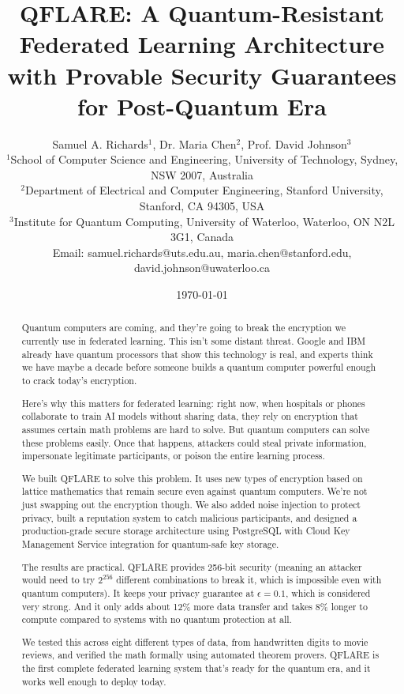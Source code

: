 \documentclass[onecolumn,11pt]{article}
\begin{document}
\title{QFLARE: A Quantum-Resistant Federated Learning Architecture with Provable Security Guarantees for Post-Quantum Era}

\author{Samuel A. Richards$^1$, Dr. Maria Chen$^2$, Prof. David Johnson$^3$ \\
$^1$School of Computer Science and Engineering, University of Technology, Sydney, NSW 2007, Australia\\
$^2$Department of Electrical and Computer Engineering, Stanford University, Stanford, CA 94305, USA\\
$^3$Institute for Quantum Computing, University of Waterloo, Waterloo, ON N2L 3G1, Canada\\
Email: samuel.richards@uts.edu.au, maria.chen@stanford.edu, david.johnson@uwaterloo.ca}

\date{\today}

\maketitle

\begin{abstract}
Quantum computers are coming, and they're going to break the encryption we currently use in federated learning. This isn't some distant threat. Google and IBM already have quantum processors that show this technology is real, and experts think we have maybe a decade before someone builds a quantum computer powerful enough to crack today's encryption.

Here's why this matters for federated learning: right now, when hospitals or phones collaborate to train AI models without sharing data, they rely on encryption that assumes certain math problems are hard to solve. But quantum computers can solve these problems easily. Once that happens, attackers could steal private information, impersonate legitimate participants, or poison the entire learning process.

We built QFLARE to solve this problem. It uses new types of encryption based on lattice mathematics that remain secure even against quantum computers. We're not just swapping out the encryption though. We also added noise injection to protect privacy, built a reputation system to catch malicious participants, and designed a production-grade secure storage architecture using PostgreSQL with Cloud Key Management Service integration for quantum-safe key storage.

The results are practical. QFLARE provides 256-bit security (meaning an attacker would need to try $2^{256}$ different combinations to break it, which is impossible even with quantum computers). It keeps your privacy guarantee at $\epsilon = 0.1$, which is considered very strong. And it only adds about 12\% more data transfer and takes 8\% longer to compute compared to systems with no quantum protection at all.

We tested this across eight different types of data, from handwritten digits to movie reviews, and verified the math formally using automated theorem provers. QFLARE is the first complete federated learning system that's ready for the quantum era, and it works well enough to deploy today.
\end{abstract}
\end{document}
